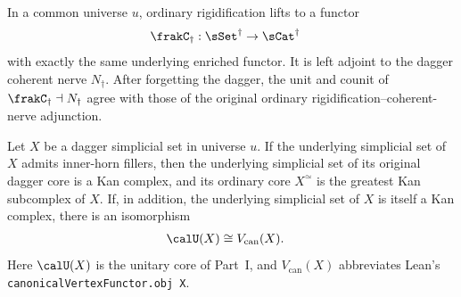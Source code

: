 \begin{resultblock}
\begin{theorem}
In a common universe $u$, ordinary rigidification lifts to a functor
\begin{align}
  \frakC_{\dag}:\sSet^{\dag}
    &\to \sCat^{\dag}
\end{align}
with exactly the same underlying enriched functor.
It is left adjoint to the dagger coherent nerve $N_{\dag}$.
After forgetting the dagger, the unit and counit of $\frakC_{\dag}\dashv N_{\dag}$ agree with those of the original ordinary rigidification--coherent-nerve adjunction.
\end{theorem}
\end{resultblock}

\begin{resultblock}
\begin{theorem}
Let $X$ be a dagger simplicial set in universe $u$.
If the underlying simplicial set of $X$ admits inner-horn fillers, then the underlying simplicial set of its original dagger core is a Kan complex, and its ordinary core $X^{\simeq}$ is the greatest Kan subcomplex of $X$.
If, in addition, the underlying simplicial set of $X$ is itself a Kan complex, there is an isomorphism
\begin{align}
  \calU(X)&\cong V_{\mathrm{can}}(X).
\end{align}
Here $\calU(X)$ is the unitary core of Part~I, and $V_{\mathrm{can}}(X)$ abbreviates Lean's \nolinkurl{canonicalVertexFunctor.obj X}.
\end{theorem}
\end{resultblock}
